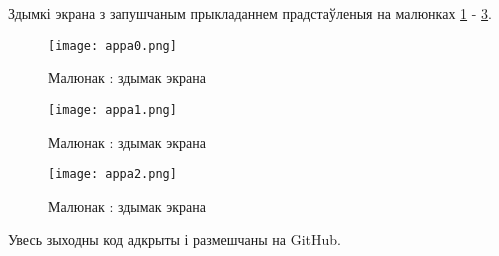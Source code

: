 Здымкі экрана з запушчаным прыкладаннем прадстаўленыя на малюнках \ref{fig:screenshot1} - \ref{fig:screenshot3}.

\begin{figure}[H]
  \centering
  \texttt{[image: appa0.png]}
  \captionsetup{labelformat=empty}
  \caption{Малюнак : здымак экрана}
  \label{fig:screenshot1}
\end{figure}

\begin{figure}[H]
  \centering
  \texttt{[image: appa1.png]}
  \captionsetup{labelformat=empty}
  \caption{Малюнак : здымак экрана}
  \label{fig:screenshot2}
\end{figure}

\begin{figure}[H]
  \centering
  \texttt{[image: appa2.png]}
  \captionsetup{labelformat=empty}
  \caption{Малюнак : здымак экрана}
  \label{fig:screenshot3}
\end{figure}

Увесь зыходны код адкрыты і размешчаны на GitHub.

\newpage

